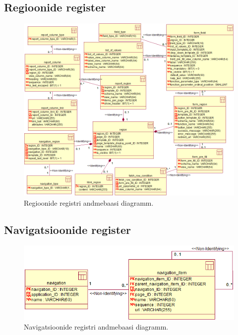 \documentclass[a4paper,12pt]{article} %
\begin{document}
\subsection*{Regioonide register}
\begin{figure}[H]
\centering
\includegraphics[width=\textwidth]{./diagrams/region-db-diagram.png}
\caption{Regioonide registri andmebaasi diagramm.}
\label{fig_regioonide_registri_andmebaasi_diagramm}
\end{figure}

\subsection*{Navigatsioonide register}
\begin{figure}[H]
\centering
\includegraphics[width=\textwidth]{./diagrams/navigation-db-diagram.png}
\caption{Navigatsioonide registri andmebaasi diagramm.}
\label{fig_navigatsioonide_registri_andmebaasi_diagramm}
\end{figure}
\end{document}
